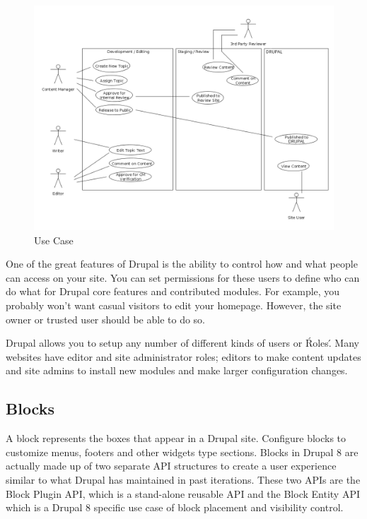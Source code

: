 \begin{figure}[H]
\centering
\includegraphics[width=14cm]{Chapter2/use_case.png}
\caption{Use Case}
\label{fig:use_case}
\end{figure}

One of the great features of Drupal is the ability to control how and what people can access on your site. You can set permissions for these users to define who can do what for Drupal core features and contributed modules. For example, you probably won't want casual visitors to edit your homepage. However, the site owner or trusted user should be able to do so. 

Drupal allows you to setup any number of different kinds of users or \'Roles\'. Many websites have editor and site administrator roles; editors to make content updates and site admins to install new modules and make larger configuration changes.

\subsection{Blocks}

A block represents the boxes that appear in a Drupal site. Configure blocks to customize menus, footers and other widgets type sections. Blocks in Drupal 8 are actually made up of two separate API structures to create a user experience similar to what Drupal has maintained in past iterations. These two APIs are the Block Plugin API, which is a stand-alone reusable API and the Block Entity API which is a Drupal 8 specific use case of block placement and visibility control.
	
